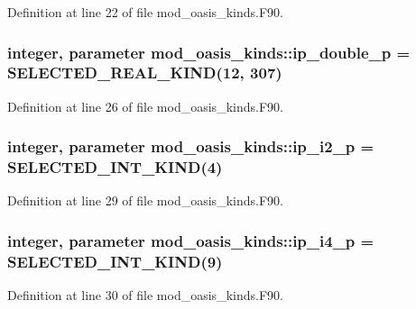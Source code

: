 Definition at line 22 of file mod\+\_\+oasis\+\_\+kinds.\+F90.

\hypertarget{classmod__oasis__kinds_aff0b6e4604e7a60178eeca47edec1460}{
\subsubsection[{ip\+\_\+double\+\_\+p}]{\setlength{\rightskip}{0pt plus 5cm}integer, parameter mod\+\_\+oasis\+\_\+kinds\+::ip\+\_\+double\+\_\+p = S\+E\+L\+E\+C\+T\+E\+D\+\_\+\+R\+E\+A\+L\+\_\+\+K\+I\+N\+D(12, 307)}}\label{classmod__oasis__kinds_aff0b6e4604e7a60178eeca47edec1460}


Definition at line 26 of file mod\+\_\+oasis\+\_\+kinds.\+F90.

\hypertarget{classmod__oasis__kinds_a27d396cfa521ce47479118dee466eb3c}{
\subsubsection[{ip\+\_\+i2\+\_\+p}]{\setlength{\rightskip}{0pt plus 5cm}integer, parameter mod\+\_\+oasis\+\_\+kinds\+::ip\+\_\+i2\+\_\+p = S\+E\+L\+E\+C\+T\+E\+D\+\_\+\+I\+N\+T\+\_\+\+K\+I\+N\+D(4)}}\label{classmod__oasis__kinds_a27d396cfa521ce47479118dee466eb3c}


Definition at line 29 of file mod\+\_\+oasis\+\_\+kinds.\+F90.

\hypertarget{classmod__oasis__kinds_a1e3c90ad6857ff8675d3e2548d516200}{
\subsubsection[{ip\+\_\+i4\+\_\+p}]{\setlength{\rightskip}{0pt plus 5cm}integer, parameter mod\+\_\+oasis\+\_\+kinds\+::ip\+\_\+i4\+\_\+p = S\+E\+L\+E\+C\+T\+E\+D\+\_\+\+I\+N\+T\+\_\+\+K\+I\+N\+D(9)}}\label{classmod__oasis__kinds_a1e3c90ad6857ff8675d3e2548d516200}


Definition at line 30 of file mod\+\_\+oasis\+\_\+kinds.\+F90.

